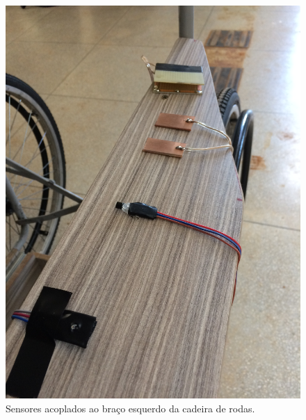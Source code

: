 \begin{figure}[h!]
    \begin{center}
        \includegraphics[scale=0.07]{figuras/psem2.jpg}
    \end{center}
    \caption{Sensores acoplados ao braço esquerdo da cadeira de rodas.}
    \label{fig:psem2}
\end{figure}
